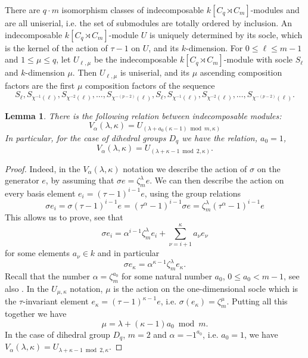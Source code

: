 \documentclass[11pt,letterpaper]{amsart}
\newtheorem{lemma}[theorem]{Lemma}
\theoremstyle{definition}
\renewcommand{\mod}{\bmod}
\begin{document}
There are $q\cdot m$ isomorphism classes of indecomposable $k[C_q \rtimes C_m]$-modules and are all uniserial, i.e. the set of  submodules are totally ordered by inclusion. An indecomposable $k[C_q \rtimes C_m]$-module $U$ is uniquely determined by its socle, which is the kernel of the action of $\tau-1$ on $U$, and its $k$-dimension. For $0 \leq \ell \leq m-1$ and $1\leq \mu \leq q$, let $U_{\ell,\mu}$ be the indecomposable $k[C_q\rtimes C_m]$-module with socle $S_\ell$ and $k$-dimension $\mu$. Then $U_{\ell,\mu}$ is uniserial, {\cite[rem. 3.4]{MR4130074}} and its $\mu$
ascending composition factors are the first $\mu$ composition factors of the sequence 
\[
S_\ell, S_{\chi^{-1}(\ell)},S_{\chi^{-2}(\ell)},\ldots,S_{\chi^{-(p-2)}(\ell)}, 
S_{\ell}, S_{\chi^{-1}(\ell)},S_{\chi^{-2}(\ell)},\ldots, S_{\chi^{-(p-2)}(\ell)}.
\]
\begin{lemma}
\label{comparisonIndec}
There is the following relation between indecomposable modules:
\[
V_{\alpha}(\lambda,\kappa)=U_{(\lambda+a_0(\kappa-1) \mod m,\kappa)}
\]
In particular, for the case of dihedral groups $D_q$
we have the relation, {$a_0=1$},
\[
  V_{\alpha}(\lambda,\kappa)=U_{(\lambda+\kappa-1  \mod  2,\kappa)}.
\]
\end{lemma}
\begin{proof}
Indeed, in the $V_{\alpha}(\lambda,\kappa)$ notation we describe the action of $\sigma$ on the generator $e$, by assuming that  $\sigma e= \zeta_m^\lambda e$.
We can then describe the action on every basis element $e_i=(\tau-1)^{i-1}e$, using the group relations 
\[
  \sigma e_i =\sigma(\tau-1)^{i-1}e= (\tau^\alpha-1)^{i-1}\sigma e =
  \zeta_m^\lambda (\tau^\alpha-1)^{i-1} e
\]
This allows us to prove, see \cite[lemma 10]{MR4779377} that 
\[
  \sigma e_i =\alpha^{i-1} \zeta_m^\lambda 
  {e_i}
  + \sum_{\nu=i+1}^\kappa a_\nu e_\nu
\]
for some elements $a_\nu\in k$ and in particular
\[
  \sigma e_\kappa =  \alpha^{\kappa-1} \zeta_m^{\lambda}
  {e_\kappa }. 
\]
Recall that the number $\alpha=\zeta_m^{a_0}$ for some natural number $a_0$, $0\leq a_0 < m-1$, see also \cite[lemma 2]{MR4779377}. In the $U_{\mu,\kappa}$ notation, $\mu$ is the action on the one-dimensional socle which is the $\tau$-invariant element 
$e_\kappa=(\tau-1)^{\kappa-1}e$, i.e. $\sigma(e_\kappa)=\zeta_m^\mu$. Putting all this together we have 
\[
  \mu = \lambda + (\kappa-1)a_0 \mod m. 
\]
In the case of dihedral group $D_q$, $m=2$ and $\alpha=-1^{a_0}$, i.e.
$a_0=1$, we have $V_{\alpha}(\lambda,\kappa)=U_{\lambda+\kappa-1 \mod 2,\kappa}$. 
\end{proof}
\end{document}
